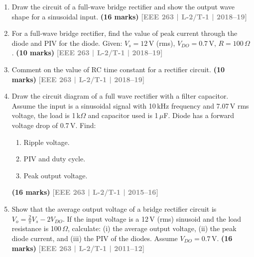 \documentclass[12pt]{article}
\newcommand{\yr}[1]{\hfill\textcolor{gray}{\small\textbf{[#1]}}}
\newcommand{\mk}[1]{\textcolor{orange!70!black}{\small\textbf{(#1 marks)}}}
\begin{document}
\begin{enumerate}
\begin{center}

\end{center}
\mk{23} \yr{EEE 263 | L-2/T-1 | 2020--21}


\item Draw the circuit of a full-wave bridge rectifier and show the output wave shape for a sinusoidal input.
\mk{16} \yr{EEE 263 | L-2/T-1 | 2018--19}


\item For a full-wave bridge rectifier, find the value of peak current through the diode and PIV for the diode. Given: $V_s=12\,\text{V}$ (rms), $V_{DO}=0.7\,\text{V}$, $R=100\,\Omega$.
\mk{10} \yr{EEE 263 | L-2/T-1 | 2018--19}


\item Comment on the value of RC time constant for a rectifier circuit.
\mk{10} \yr{EEE 263 | L-2/T-1 | 2018--19}


\item Draw the circuit diagram of a full wave rectifier with a filter capacitor. Assume the input is a sinusoidal signal with 10\,kHz frequency and 7.07\,V rms voltage, the load is 1\,k$\Omega$ and capacitor used is 1\,$\mu$F. Diode has a forward voltage drop of 0.7\,V. Find:
\begin{enumerate}
  \item Ripple voltage.
  \item PIV and duty cycle.
  \item Peak output voltage.
\end{enumerate}
\mk{16} \yr{EEE 263 | L-2/T-1 | 2015--16}


\item Show that the average output voltage of a bridge rectifier circuit is $V_o = \frac{2}{\pi}V_s - 2V_{DO}$. If the input voltage is a 12\,V (rms) sinusoid and the load resistance is 100\,$\Omega$, calculate: (i) the average output voltage, (ii) the peak diode current, and (iii) the PIV of the diodes. Assume $V_{DO}=0.7\,\text{V}$.
\mk{16} \yr{EEE 263 | L-2/T-1 | 2011--12}


\end{enumerate}
\end{document}
